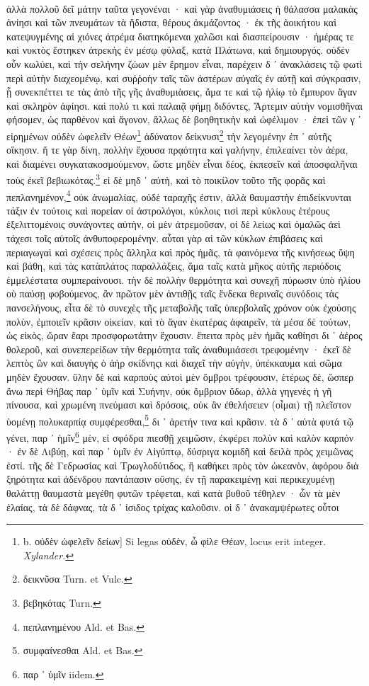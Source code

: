 \documentclass[a4paper, 11pt, oneside, polutonikogreek, german]{article}
\begin{document}
\paragraph{}
ἀλλὰ πολλοῦ δεῖ μάτην ταῦτα γεγονέναι · καὶ γὰρ ἀναθυμιάσεις ἡ θάλασσα μαλακὰς ἀνίησι καὶ τῶν πνευμάτων τὰ ἥδιστα, θέρους ἀκμάζοντος · ἐκ τῆς ἀοικήτου καὶ κατεψυγμένης αἱ χιόνες ἀτρέμα διατηκόμεναι χαλῶσι καὶ διασπείρουσιν · ἡμέρας τε καὶ νυκτὸς ἕστηκεν ἀτρεκὴς ἐν μέσῳ φύλαξ, κατὰ Πλάτωνα, καὶ δημιουργός. οὐδὲν οὖν κωλύει, καὶ τὴν σελήνην ζώων μὲν ἔρημον εἶναι, παρέχειν δ ᾽ ἀνακλάσεις τῷ φωτὶ περὶ αὐτὴν διαχεομένῳ, καὶ συῤῥοὴν ταῖς τῶν ἀστέρων αὐγαῖς ἐν αὐτῇ καὶ σύγκρασιν, ᾗ συνεκπέττει τε τὰς ἀπὸ τῆς γῆς ἀναθυμιὰσεις, ἅμα τε καὶ τῷ ἡλίῳ τὸ ἔμπυρον ἄγαν καὶ σκληρὸν ἀφίησι. καὶ πολύ τι καὶ παλαιᾷ φήμῃ διδόντες, Ἄρτεμιν αὐτὴν νομισθῆναι φήσομεν, ὡς παρθένον καὶ ἄγονον, ἄλλως δὲ βοηθητικὴν καὶ ὠφέλιμον · ἐπεὶ τῶν γ ᾽ εἰρημένων οὐδὲν ὠφελεῖν Θέων\footnote{b. οὐδὲν ὠφελεῖν δείων] Si legas οὐδὲν, ὦ φίλε Θέων, locus erit integer. \emph{Xylander.}} ἀδύνατον δείκνυσι\footnote{δεικνῦσα Turn. et Vulc.} τὴν λεγομένην ἐπ ᾽ αὐτῆς οἴκησιν. ἥ τε γὰρ δίνη, πολλὴν ἔχουσα πρᾳότητα καὶ γαλήνην, ἐπιλεαίνει τὸν ἀέρα, καὶ διαμένει συγκατακοσμούμενον, ὥστε μηδὲν εἶναι δέος, ἐκπεσεῖν καὶ ἀποσφαλῆναι τοὺς ἐκεῖ βεβιωκότας.\footnote{βεβηκότας Turn.} εἰ δὲ μηδ ᾽ αὐτὴ, καὶ τὸ ποικίλον τοῦτο τῆς φορᾶς καὶ πεπλανημένον,\footnote{πεπλανημένου Ald. et Bas.} οὐκ ἀνωμαλίας, οὐδὲ ταραχῆς ἐστιν, ἀλλὰ θαυμαστὴν ἐπιδείκνυνται τάξιν ἐν τούτοις καὶ πορείαν οἱ ἀστρολόγοι, κύκλοις τισὶ περὶ κύκλους ἑτέρους ἐξελιττομένοις συνάγοντες αὐτὴν, οἱ μὲν ἀτρεμοῦσαν, οἱ δὲ λείως καὶ ὁμαλῶς ἀεὶ τάχεσι τοῖς αὐτοῖς ἀνθυποφερομένην. αὗται γὰρ αἱ τῶν κύκλων ἐπιβάσεις καὶ περιαγωγαὶ καὶ σχέσεις πρὸς ἄλληλα καὶ πρὸς ἡμᾶς, τὰ φαινόμενα τῆς κινήσεως ὕψη καὶ βάθη, καὶ τὰς κατὰπλάτος παραλλάξεις, ἅμα ταῖς κατὰ μῆκος αὐτῆς περιόδοις ἐμμελέστατα συμπεραίνουσι. τὴν δὲ πολλὴν θερμότητα καὶ συνεχῆ πύρωσιν ὑπὸ ἡλίου οὐ παύσῃ φοβούμενος, ἂν πρῶτον μὲν ἀντιθῇς ταῖς ἕνδεκα θεριναῖς συνόδοις τὰς πανσελήνους, εἶτα δὲ τὸ συνεχὲς τῆς μεταβολῆς ταῖς ὑπερβολαῖς χρόνον οὐκ ἐχούσης πολὺν, ἐμποιεῖν κρᾶσιν οἰκείαν, καὶ τὸ ἄγαν ἑκατέρας ἀφαιρεῖν, τὰ μέσα δὲ τούτων, ὡς εἰκὸς, ὥραν ἔαρι προσφορωτάτην ἔχουσιν. ἔπειτα πρὸς μὲν ἡμᾶς καθίησι δι ᾽ ἀέρος θολεροῦ, καὶ συνεπερείδων τὴν θερμότητα ταῖς ἀναθυμιάσεσι τρεφομένην · ἐκεῖ δὲ λεπτὸς ὢν καὶ διαυγὴς ὁ ἀὴρ σκίδνηςι καὶ διαχεῖ τὴν αὐγὴν, ὑπέκκαυμα καὶ σῶμα μηδὲν ἔχουσαν. ὕλην δὲ καὶ καρποὺς αὐτοὶ μὲν ὄμβροι τρέφουσιν, ἑτέρως δὲ, ὥσπερ ἄνω περὶ Θήβας παρ ᾽ ὑμῖν καὶ Συήνην, οὐκ ὄμβριον ὕδωρ, ἀλλὰ γηγενὲς ἡ γῆ πίνουσα, καὶ χρωμένη πνεύμασι καὶ δρόσοις, οὐκ ἂν ἐθελήσειεν (οἶμαι) τῇ πλεῖστον ὑομένῃ πολυκαρπίᾳ συμφέρεσθαι,\footnote{συμφαίνεσθαι Ald. et Bas.} δι ᾽ ἀρετήν τινα καὶ κρᾶσιν. τὰ δ ᾽ αὐτὰ φυτά τῷ γένει, παρ ᾽ ἡμῖν\footnote{παρ ᾽ ὑμῖν iidem.} μὲν, εἰ σφόδρα πιεσθῇ χειμῶσιν, ἐκφέρει πολὺν καὶ καλὸν καρπόν · ἐν δὲ Λιβύῃ, καὶ παρ ᾽ ὑμῖν ἐν Αἰγύπτῳ, δύσριγα κομιδῆ καὶ δειλὰ πρὸς χειμῶνας ἐστί. τῆς δὲ Γεδρωσίας καὶ Τρωγλοδύτιδος, ἣ καθήκει πρὸς τὸν ὠκεανὸν, ἀφόρου διὰ ξηρότητα καὶ ἀδένδρου παντάπασιν οὔσης, ἐν τῇ παρακειμένῃ καὶ περικεχυμένῃ θαλάττῃ θαυμαστὰ μεγέθη φυτῶν τρέφεται, καὶ κατὰ βυθοῦ τέθηλεν · ὧν τὰ μὲν ἐλαίας, τὰ δὲ δάφνας, τὰ δ ᾽ ἰσιδος τρίχας καλοῦσιν. οἱ δ ᾽ ἀνακαμψέρωτες οὗτοι 
\end{document}
